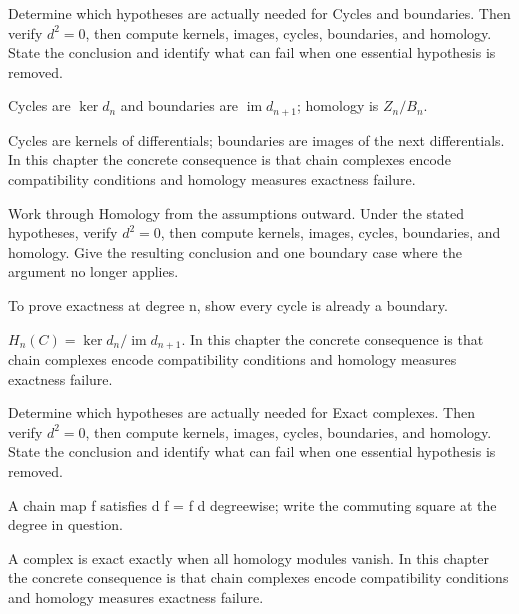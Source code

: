 \begin{exercise}\label{exr:v22-02}
Determine which hypotheses are actually needed for Cycles and boundaries. Then verify \(d^2=0\), then compute kernels, images, cycles, boundaries, and homology. State the conclusion and identify what can fail when one essential hypothesis is removed.
\end{exercise}
\begin{hint}
Cycles are \(\ker d_n\) and boundaries are \(\operatorname{im}d_{n+1}\); homology is \(Z_n/B_n\).
\end{hint}
\begin{solution}
Cycles are kernels of differentials; boundaries are images of the next differentials. In this chapter the concrete consequence is that chain complexes encode compatibility conditions and homology measures exactness failure.
\end{solution}

\begin{exercise}\label{exr:v22-03}
Work through Homology from the assumptions outward. Under the stated hypotheses, verify \(d^2=0\), then compute kernels, images, cycles, boundaries, and homology. Give the resulting conclusion and one boundary case where the argument no longer applies.
\end{exercise}
\begin{hint}
To prove exactness at degree n, show every cycle is already a boundary.
\end{hint}
\begin{solution}
$H_n(C)=\ker d_n/\operatorname{im}d_{n+1}$. In this chapter the concrete consequence is that chain complexes encode compatibility conditions and homology measures exactness failure.
\end{solution}

\begin{exercise}\label{exr:v22-04}
Determine which hypotheses are actually needed for Exact complexes. Then verify \(d^2=0\), then compute kernels, images, cycles, boundaries, and homology. State the conclusion and identify what can fail when one essential hypothesis is removed.
\end{exercise}
\begin{hint}
A chain map f satisfies d f = f d degreewise; write the commuting square at the degree in question.
\end{hint}
\begin{solution}
A complex is exact exactly when all homology modules vanish. In this chapter the concrete consequence is that chain complexes encode compatibility conditions and homology measures exactness failure.
\end{solution}

